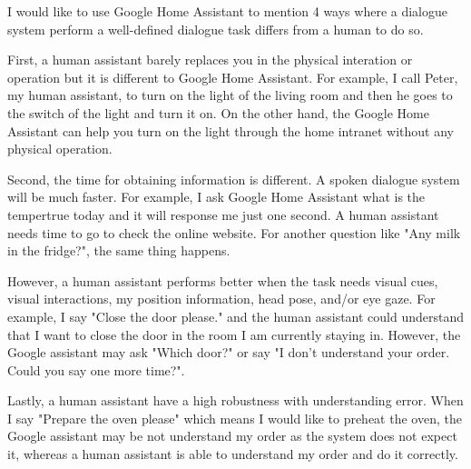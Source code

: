 \documentclass[12pt]{article}
\newenvironment{problem}[2][Problem]{\begin{trivlist}
\item[\hskip \labelsep {\bfseries #1}\hskip \labelsep {\bfseries #2.}]}{\end{trivlist}}
\begin{document}
\pagebreak
\begin{problem}{3.1}
    I would like to use Google Home Assistant to mention 4 ways where a dialogue
    system perform a well-defined dialogue task differs from a human to do so.

    First, a human assistant barely replaces you in the physical interation or 
    operation but it is different to Google Home Assistant.
    For example, I call Peter, my human assistant, to turn on the light of the 
    living room and then he goes to the switch of the light and turn it on. On 
    the other hand, the Google Home Assistant can help you turn on the light
    through the home intranet without any physical operation. 

    Second, the time for obtaining information is different. A spoken dialogue 
    system will be much faster. For example, I ask Google Home Assistant what
    is the tempertrue today and it will response me just one second. A human 
    assistant needs time to go to check the online website. For another question
    like "Any milk in the fridge?", the same thing happens.

    However, a human assistant performs better when the task needs visual
    cues, visual interactions, my position information, head pose, and/or eye
    gaze. For example, I say "Close the door please." and the human assistant
    could understand that I want to close the door in the room I am currently
    staying in. However, the Google assistant may ask "Which door?" or say
    "I don't understand your order. Could you say one more time?".

    Lastly, a human assistant have a high robustness with understanding error.
    When I say "Prepare the oven please" which means I would like to preheat the 
    oven, the Google assistant may be not understand my order as the system does
    not expect it, whereas a human assistant is able to understand my order and 
    do it correctly.
\end{problem}
\end{document}
